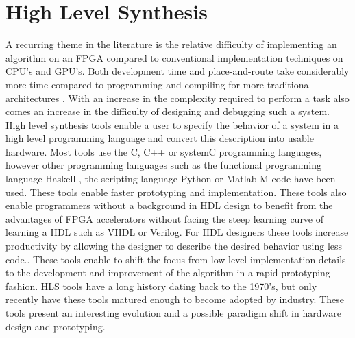 

\chapter{High Level Synthesis}



A recurring theme in the literature is the relative difficulty of implementing an algorithm on an FPGA compared to conventional implementation techniques on CPU's and GPU's. Both development time and place-and-route take considerably more time compared to programming and compiling for more traditional architectures \cite{inta_chimera:_2012,tsoi_axel:_2010}. With an increase in the complexity required to perform a task also comes an increase in the difficulty of designing and debugging such a system. 
High level synthesis tools enable a user to specify the behavior of a system in a high level programming language and convert this description into usable hardware. Most tools use the C, C++ or systemC programming languages, however other programming languages such as the functional programming language Haskell \cite{baaij2010c}, the scripting language Python\cite{decaluwe2004myhdl} or Matlab M-code\cite{hdlcoder} have been used. These tools enable faster prototyping and implementation\cite{che_accelerating_2008}. These tools also enable programmers without a background in HDL design to benefit from the advantages of FPGA accelerators without facing the steep learning curve of learning a HDL such as VHDL or Verilog. For HDL designers these tools increase productivity by allowing the designer to describe the desired behavior using less code.\cite{casseau_c-_2005}. 
These tools enable to shift the focus from low-level implementation details to the development and improvement of the algorithm in a rapid prototyping fashion\cite{wakabayashi_c-based_2004}.
HLS tools have a long history dating back to the 1970's, but only recently have these tools matured enough to become adopted by industry. These tools present an interesting evolution and a possible paradigm shift in hardware design and prototyping\cite{cong_high-level_2011}.



